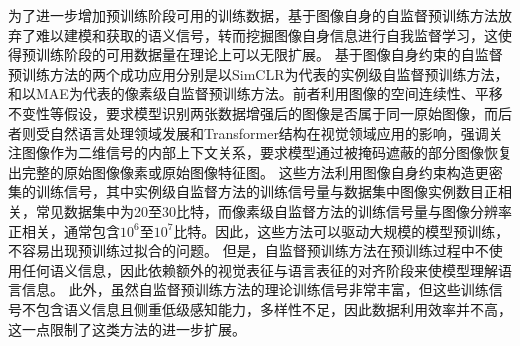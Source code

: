 为了进一步增加预训练阶段可用的训练数据，基于图像自身的自监督预训练方法放弃了难以建模和获取的语义信号，转而挖掘图像自身信息进行自我监督学习，这使得预训练阶段的可用数据量在理论上可以无限扩展。
基于图像自身约束的自监督预训练方法的两个成功应用分别是以SimCLR\cite{chen2020simple}为代表的实例级自监督预训练方法，和以MAE\cite{he2022masked}为代表的像素级自监督预训练方法。前者利用图像的空间连续性、平移不变性等假设，要求模型识别两张数据增强后的图像是否属于同一原始图像\cite{moco,byol,dino}，而后者则受自然语言处理领域\cite{BERT,gpt2}发展和Transformer结构在视觉领域应用\cite{dosovitskiy2020vit}的影响，强调关注图像作为二维信号的内部上下文关系，要求模型通过被掩码遮蔽的部分图像恢复出完整的原始图像像素或原始图像特征图\cite{ImageGPT,bao2021beit,xie2022simmim,baevski2022data2vec}。
这些方法利用图像自身约束构造更密集的训练信号，其中实例级自监督方法的训练信号量与数据集中图像实例数目正相关，常见数据集中为20至30比特，而像素级自监督方法的训练信号量与图像分辨率正相关，通常包含$10^6$至$10^7$比特。因此，这些方法可以驱动大规模的模型预训练，不容易出现预训练过拟合的问题。
但是，自监督预训练方法在预训练过程中不使用任何语义信息，因此依赖额外的视觉表征与语言表征的对齐阶段来使模型理解语言信息。
此外，虽然自监督预训练方法的理论训练信号非常丰富，但这些训练信号不包含语义信息且侧重低级感知能力，多样性不足，因此数据利用效率并不高\cite{SEER, xie2023data}，这一点限制了这类方法的进一步扩展。


